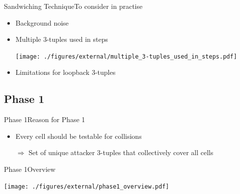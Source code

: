 \documentclass[aspectratio=169, hyperref={colorlinks=true, allcolors=SecondaryColor}, c]{beamer}
\begin{document}
	\begin{frame}[fragile, t]{Sandwiching Technique}{To consider in practise}
		\begin{itemize}
			\item \alert{Background noise}

			\item \alert{Multiple 3-tuples used in steps}

			\texttt{[image: ./figures/external/multiple\_3-tuples\_used\_in\_steps.pdf]} %
			\item \alert{Limitations for loopback 3-tuples}

		\end{itemize}
	\end{frame}
\else
\fi

\ifattackphaseone
	\subsection{Phase 1}

	\begin{frame}[fragile]{Phase 1}{Reason for Phase 1}
		\begin{adjustbox}{max width=\textwidth}
		\end{adjustbox}
		\begin{itemize}
			\item Every cell should be testable for collisions
			\item[\alert{$\Rightarrow$}] Set of \alert{unique attacker 3-tuples} that collectively cover all cells
		\end{itemize}
	\end{frame}

	\begin{frame}[fragile]{Phase 1}{Overview}
		\vspace{0.2cm}

		\texttt{[image: ./figures/external/phase1\_overview.pdf]}
	\end{frame}
\end{document}
